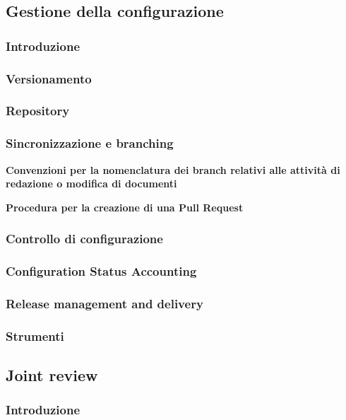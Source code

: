 \subsection{Gestione della configurazione}
\subsubsection{Introduzione}
\subsubsection{Versionamento}
\subsubsection{Repository}
\subsubsection{Sincronizzazione e branching}

\textbf{Convenzioni per la nomenclatura dei branch relativi alle attività di redazione o modifica di documenti} \label{convenzioni_nomenclatura}


\textbf{Procedura per la creazione di una Pull Request} \label{pull_request}

\subsubsection{Controllo di configurazione}
\subsubsection{Configuration Status Accounting}
\subsubsection{Release management and delivery}
\subsubsection{Strumenti}
\subsection{Joint review}
\subsubsection{Introduzione}
